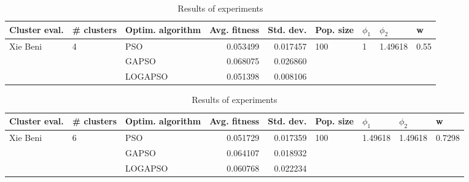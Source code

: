 \documentclass{article}
\begin{document}
\begin{table}
\centering
\caption{Results of experiments}
\begin{tabular}{lllrrllll}
\toprule
            Cluster eval. &        \# clusters & Optim. algorithm &  Avg. fitness &  Std. dev. &            Pop. size &         $\phi_{1}$ &               $\phi_{2}$ &                     w \\
\midrule
\multirow{3}{*}{Xie Beni} & \multirow{3}{*}{4} &              PSO &      0.053499 &   0.017457 & \multirow{3}{*}{100} & \multirow{3}{*}{1} & \multirow{3}{*}{1.49618} & \multirow{3}{*}{0.55} \\
                          &                    &            GAPSO &      0.068075 &   0.026860 &                      &                    &                          &                       \\
                          &                    &          LOGAPSO &      0.051398 &   0.008106 &                      &                    &                          &                       \\
\bottomrule
\end{tabular}
\end{table}
\begin{table}
\centering
\caption{Results of experiments}
\begin{tabular}{lllrrllll}
\toprule
            Cluster eval. &        \# clusters & Optim. algorithm &  Avg. fitness &  Std. dev. &            Pop. size &               $\phi_{1}$ &               $\phi_{2}$ &                       w \\
\midrule
\multirow{3}{*}{Xie Beni} & \multirow{3}{*}{6} &              PSO &      0.051729 &   0.017359 & \multirow{3}{*}{100} & \multirow{3}{*}{1.49618} & \multirow{3}{*}{1.49618} & \multirow{3}{*}{0.7298} \\
                          &                    &            GAPSO &      0.064107 &   0.018932 &                      &                          &                          &                         \\
                          &                    &          LOGAPSO &      0.060768 &   0.022234 &                      &                          &                          &                         \\
\bottomrule
\end{tabular}
\end{table}
\end{document}
